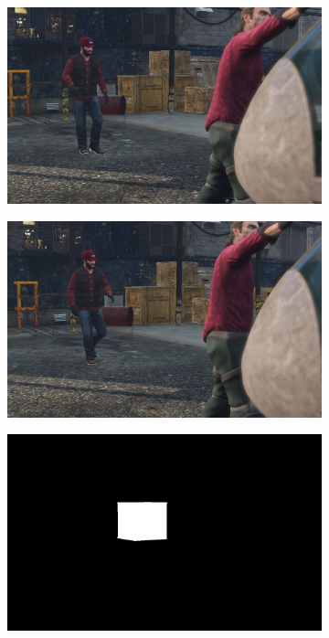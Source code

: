 \begin{figure}
\centering
\begin{subfigure}[t]{0.19\textwidth}
\centering
\includegraphics[scale=0.07]{good_examples/visual_211770_img.png}
\end{subfigure}
\begin{subfigure}[t]{0.19\textwidth}
\centering
\includegraphics[scale=0.07]{good_examples/visual_211770_img1.png}
\end{subfigure}
\begin{subfigure}[t]{0.19\textwidth}
\centering
\includegraphics[scale=0.07]{good_examples/visual_211770_gt.png}

\end{subfigure}
\end{figure}

